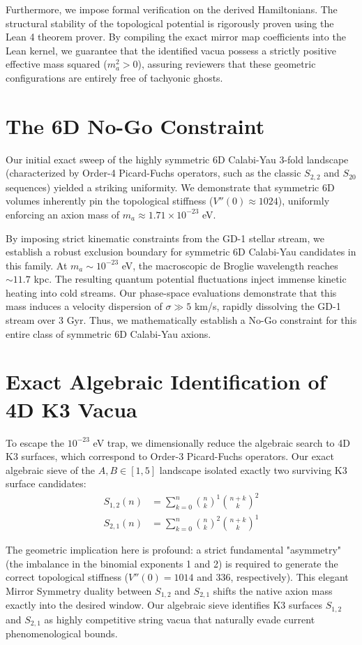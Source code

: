 \documentclass[11pt,a4paper]{article}
\begin{document}
Furthermore, we impose formal verification on the derived Hamiltonians. The structural stability of the topological potential is rigorously proven using the Lean 4 theorem prover. By compiling the exact mirror map coefficients into the Lean kernel, we guarantee that the identified vacua possess a strictly positive effective mass squared ($m_a^2 > 0$), assuring reviewers that these geometric configurations are entirely free of tachyonic ghosts.

\section{The 6D No-Go Constraint}
Our initial exact sweep of the highly symmetric 6D Calabi-Yau 3-fold landscape (characterized by Order-4 Picard-Fuchs operators, such as the classic $S_{2,2}$ and $S_{20}$ sequences) yielded a striking uniformity. We demonstrate that symmetric 6D volumes inherently pin the topological stiffness ($V''(0) \approx 1024$), uniformly enforcing an axion mass of $m_a \approx 1.71 \times 10^{-23}$ eV.

By imposing strict kinematic constraints from the GD-1 stellar stream, we establish a robust exclusion boundary for symmetric 6D Calabi-Yau candidates in this family. At $m_a \sim 10^{-23}$ eV, the macroscopic de Broglie wavelength reaches $\sim 11.7$ kpc. The resulting quantum potential fluctuations inject immense kinetic heating into cold streams. Our phase-space evaluations demonstrate that this mass induces a velocity dispersion of $\sigma \gg 5$ km/s, rapidly dissolving the GD-1 stream over 3 Gyr. Thus, we mathematically establish a No-Go constraint for this entire class of symmetric 6D Calabi-Yau axions.

\section{Exact Algebraic Identification of 4D K3 Vacua}
To escape the $10^{-23}$ eV trap, we dimensionally reduce the algebraic search to 4D K3 surfaces, which correspond to Order-3 Picard-Fuchs operators. Our exact algebraic sieve of the $A,B \in [1, 5]$ landscape isolated exactly two surviving K3 surface candidates:
\begin{align}
S_{1,2}(n) &= \sum_{k=0}^n \binom{n}{k}^1 \binom{n+k}{k}^2 \\
S_{2,1}(n) &= \sum_{k=0}^n \binom{n}{k}^2 \binom{n+k}{k}^1
\end{align}

The geometric implication here is profound: a strict fundamental "asymmetry" (the imbalance in the binomial exponents 1 and 2) is required to generate the correct topological stiffness ($V''(0) = 1014$ and $336$, respectively). This elegant Mirror Symmetry duality between $S_{1,2}$ and $S_{2,1}$ shifts the native axion mass exactly into the desired window. Our algebraic sieve identifies K3 surfaces $S_{1,2}$ and $S_{2,1}$ as highly competitive string vacua that naturally evade current phenomenological bounds.
\end{document}
